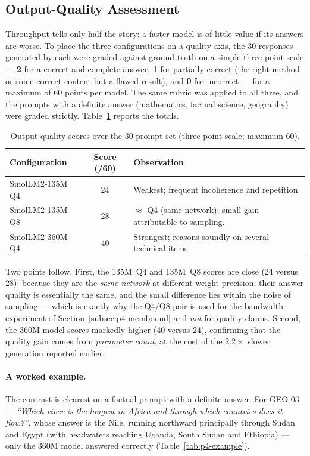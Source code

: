 \subsection{Output-Quality Assessment}
\label{subsec:p4-quality}

Throughput tells only half the story: a faster model is of little value if its answers are worse. To
place the three configurations on a quality axis, the 30 responses generated by each were graded
against ground truth on a simple three-point scale --- \textbf{2} for a correct and complete answer,
\textbf{1} for partially correct (the right method or some correct content but a flawed result), and
\textbf{0} for incorrect --- for a maximum of 60 points per model. The same rubric was applied to all
three, and the prompts with a definite answer (mathematics, factual science, geography) were graded
strictly. Table~\ref{tab:p4-quality} reports the totals.

\begin{table}[H]
\centering
\caption{Output-quality scores over the 30-prompt set (three-point scale; maximum 60).}
\label{tab:p4-quality}
\renewcommand{\arraystretch}{1.2}
\begin{tabular}{@{}lcl@{}}
\toprule
\textbf{Configuration} & \textbf{Score (/60)} & \textbf{Observation} \\
\midrule
SmolLM2-135M Q4 & 24 & Weakest; frequent incoherence and repetition. \\
SmolLM2-135M Q8 & 28 & $\approx$ Q4 (same network); small gain attributable to sampling. \\
SmolLM2-360M Q4 & 40 & Strongest; reasons soundly on several technical items. \\
\bottomrule
\end{tabular}
\end{table}

Two points follow. First, the 135M~Q4 and 135M~Q8 scores are close (24 versus 28): because they are
the \emph{same network} at different weight precision, their answer quality is essentially the same,
and the small difference lies within the noise of sampling --- which is exactly why the Q4/Q8 pair is
used for the bandwidth experiment of Section~\ref{subsec:p4-membound} and \emph{not} for quality
claims. Second, the 360M model scores markedly higher (40 versus 24), confirming that the quality
gain comes from \emph{parameter count}, at the cost of the $2.2\times$ slower generation reported
earlier.

\paragraph{A worked example.} The contrast is clearest on a factual prompt with a definite answer.
For GEO-03 --- \emph{``Which river is the longest in Africa and through which countries does it
flow?''}, whose answer is the Nile, running northward principally through Sudan and Egypt (with
headwaters reaching Uganda, South Sudan and Ethiopia) --- only the 360M model answered correctly
(Table~\ref{tab:p4-example}).

